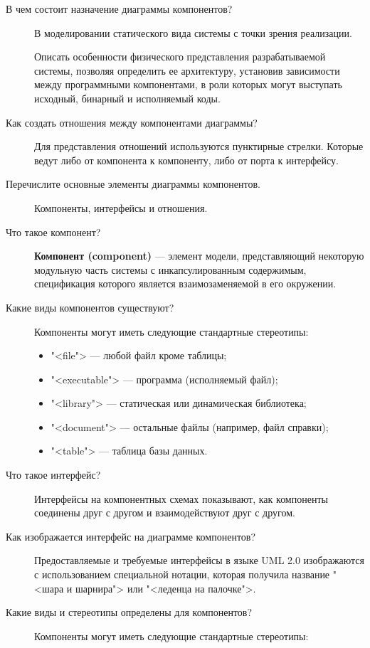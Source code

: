 \begin{description}
	\item [В чем состоит назначение диаграммы компонентов?]
		В моделировании статического вида системы с точки зрения реализации.

		Описать особенности физического представления разрабатываемой системы,
		позволяя определить ее архитектуру, установив зависимости между
		программными компонентами, в роли которых могут выступать исходный,
		бинарный и исполняемый коды.
	\item [Как создать отношения между компонентами диаграммы?]
		Для представления отношений используются пунктирные стрелки.
		Которые ведут либо от компонента к компоненту,
		либо от порта к интерфейсу.
	\item [Перечислите основные элементы диаграммы компонентов.]
		Компоненты, интерфейсы и отношения.
	\item [Что такое компонент?]
		\textbf{Компонент (component)} --- элемент модели,
		представляющий некоторую
		модульную часть системы с инкапсулированным содержимым, спецификация
		которого является взаимозаменяемой в его окружении.
	\item [Какие виды компонентов существуют?]
		Компоненты могут иметь следующие стандартные стереотипы:
		\begin{itemize}
			\item "<file"> --- любой файл кроме таблицы;
			\item "<executable"> --- программа (исполняемый файл);
			\item "<library"> --- статическая или динамическая библиотека;
			\item "<document"> --- остальные файлы (например, файл справки);
			\item "<table"> --- таблица базы данных.
		\end{itemize}
	\item [Что такое интерфейс?]
		Интерфейсы на компонентных схемах показывают, как компоненты
		соединены друг с другом и взаимодействуют друг с другом.
	\item [Как изображается интерфейс на диаграмме компонентов?]
		Предоставляемые и требуемые интерфейсы в языке UML 2.0 изображаются
		с использованием специальной нотации, которая получила название
		"<шара и шарнира"> или "<леденца на палочке">.
	\item [Какие виды и стереотипы определены для компонентов?]
		Компоненты могут иметь следующие стандартные стереотипы:
		\begin{itemize}

\end{itemize}
\end{description}
